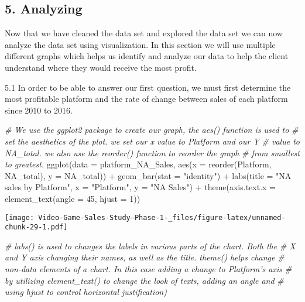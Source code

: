 \documentclass[
]{article}
\newenvironment{Shaded}{\begin{snugshade}}{\end{snugshade}}
\newcommand{\AttributeTok}[1]{\textcolor[rgb]{0.77,0.63,0.00}{#1}}
\newcommand{\CommentTok}[1]{\textcolor[rgb]{0.56,0.35,0.01}{\textit{#1}}}
\newcommand{\DecValTok}[1]{\textcolor[rgb]{0.00,0.00,0.81}{#1}}
\newcommand{\FunctionTok}[1]{\textcolor[rgb]{0.00,0.00,0.00}{#1}}
\newcommand{\NormalTok}[1]{#1}
\newcommand{\SpecialCharTok}[1]{\textcolor[rgb]{0.00,0.00,0.00}{#1}}
\newcommand{\StringTok}[1]{\textcolor[rgb]{0.31,0.60,0.02}{#1}}
\begin{document}
\hypertarget{analyzing}{%
\subsection{5. Analyzing}\label{analyzing}}

Now that we have cleaned the data set and explored the data set we can
now analyze the data set using visualization. In this section we will
use multiple different graphs which helps us identify and analyze our
data to help the client understand where they would receive the most
profit.

5.1 In order to be able to answer our first question, we must first
determine the most profitable platform and the rate of change between
sales of each platform since 2010 to 2016.

\begin{Shaded}
\begin{Highlighting}[]
\CommentTok{\# We use the ggplot2 package to create our graph, the aes() function is used to}
\CommentTok{\# set the aesthetics of the plot. we set our x value to Platform and our Y}
\CommentTok{\# value to NA\_total. we also use the reorder() function to reorder the graph}
\CommentTok{\# from smallest to greatest.}
\FunctionTok{ggplot}\NormalTok{(}\AttributeTok{data =}\NormalTok{ platform\_NA\_Sales, }\FunctionTok{aes}\NormalTok{(}\AttributeTok{x =} \FunctionTok{reorder}\NormalTok{(Platform, NA\_total), }\AttributeTok{y =}\NormalTok{ NA\_total)) }\SpecialCharTok{+}
    \FunctionTok{geom\_bar}\NormalTok{(}\AttributeTok{stat =} \StringTok{"identity"}\NormalTok{) }\SpecialCharTok{+} \FunctionTok{labs}\NormalTok{(}\AttributeTok{title =} \StringTok{"NA sales by Platform"}\NormalTok{, }\AttributeTok{x =} \StringTok{"Platform"}\NormalTok{,}
    \AttributeTok{y =} \StringTok{"NA Sales"}\NormalTok{) }\SpecialCharTok{+} \FunctionTok{theme}\NormalTok{(}\AttributeTok{axis.text.x =} \FunctionTok{element\_text}\NormalTok{(}\AttributeTok{angle =} \DecValTok{45}\NormalTok{, }\AttributeTok{hjust =} \DecValTok{1}\NormalTok{))}
\end{Highlighting}
\end{Shaded}

\texttt{[image: Video-Game-Sales-Study--Phase-1-\_files/figure-latex/unnamed-chunk-29-1.pdf]}

\begin{Shaded}
\begin{Highlighting}[]
\CommentTok{\# labs() is used to changes the labels in various parts of the chart. Both the}
\CommentTok{\# X and Y axis changing their names, as well as the title. theme() helps change}
\CommentTok{\# non{-}data elements of a chart. In this case adding a change to Platform’s axis}
\CommentTok{\# by utilizing element\_text() to change the look of texts, adding an angle and}
\CommentTok{\# using hjust to control horizontal justification)}
\end{Highlighting}
\end{Shaded}
\end{document}
